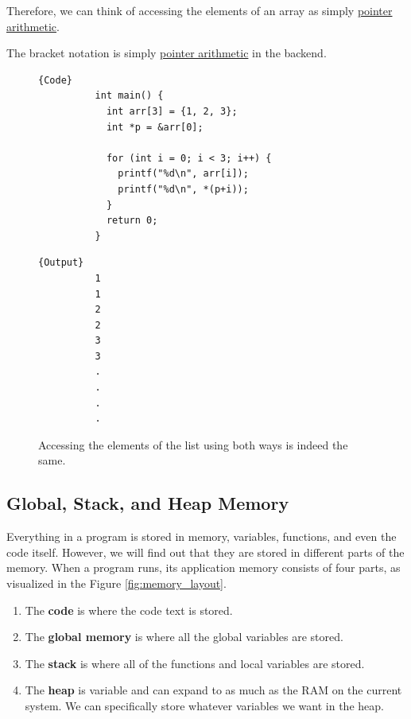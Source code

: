 \documentclass{article}
\newcounter{theorem}[section]
\newcounter{code}[section]
\begin{document}
    Therefore, we can think of accessing the elements of an array as simply \hyperref[def:pointer-arithmetic]{pointer arithmetic}. 

    \begin{theorem}
      \label{thm:bracket-notation-is-pointer-arithmetic}
      The bracket notation is simply \hyperref[def:pointer-arithmetic]{pointer arithmetic} in the backend. 
      \begin{figure}[H]
        \centering 
        \noindent\begin{minipage}{.5\textwidth}
        \begin{lstlisting}[]{Code}
          int main() { 
            int arr[3] = {1, 2, 3}; 
            int *p = &arr[0]; 

            for (int i = 0; i < 3; i++) { 
              printf("%d\n", arr[i]); 
              printf("%d\n", *(p+i)); 
            }
            return 0; 
          }
        \end{lstlisting}
        \end{minipage}
        \hfill
        \begin{minipage}{.49\textwidth}
        \begin{lstlisting}[]{Output}
          1
          1
          2
          2
          3
          3
          .
          .
          .
          .
        \end{lstlisting}
        \end{minipage}
        \caption{Accessing the elements of the list using both ways is indeed the same. } 
        \label{fig:bracket_pointer_arthimetic}
      \end{figure}
    \end{theorem}
   
  \subsection{Global, Stack, and Heap Memory}

    Everything in a program is stored in memory, variables, functions, and even the code itself. However, we will find out that they are stored in different parts of the memory. When a program runs, its application memory consists of four parts, as visualized in the Figure \ref{fig:memory_layout}. 
    \begin{enumerate} 
      \item The \textbf{code} is where the code text is stored. 
      \item The \textbf{global memory} is where all the global variables are stored. 
      \item The \textbf{stack} is where all of the functions and local variables are stored. 
      \item The \textbf{heap} is variable and can expand to as much as the RAM on the current system. We can specifically store whatever variables we want in the heap.
    \end{enumerate}
\end{document}
